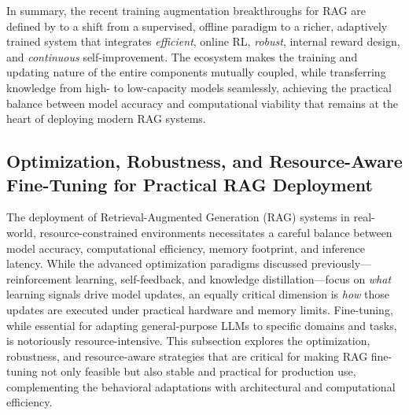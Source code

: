 \documentclass[11pt]{article}
\begin{document}
In summary, the recent training augmentation breakthroughs for RAG are defined by to a shift from a supervised, offline paradigm to a richer, adaptively trained system that integrates \emph{efficient}, online RL, \emph{robust}, internal reward design, and \emph{continuous} self-improvement. The ecosystem makes the training and updating nature of the entire components mutually coupled, while transferring knowledge from high- to low-capacity models seamlessly, achieving the practical balance between model accuracy and computational viability that remains at the heart of deploying modern RAG systems.

\subsection{Optimization, Robustness, and Resource-Aware Fine-Tuning for Practical RAG Deployment}

The deployment of Retrieval-Augmented Generation (RAG) systems in real-world, resource-constrained environments necessitates a careful balance between model accuracy, computational efficiency, memory footprint, and inference latency. While the advanced optimization paradigms discussed previously---reinforcement learning, self-feedback, and knowledge distillation---focus on \emph{what} learning signals drive model updates, an equally critical dimension is \emph{how} those updates are executed under practical hardware and memory limits. Fine-tuning, while essential for adapting general-purpose LLMs to specific domains and tasks, is notoriously resource-intensive. This subsection explores the optimization, robustness, and resource-aware strategies that are critical for making RAG fine-tuning not only feasible but also stable and practical for production use, complementing the behavioral adaptations with architectural and computational efficiency.
\end{document}
